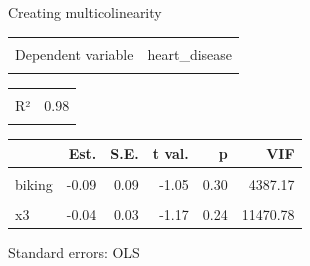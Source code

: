 \documentclass[
  ignorenonframetext,
]{beamer}
\begin{document}
\begin{frame}{Creating multicolinearity}
\protect\hypertarget{creating-multicolinearity-1}{}
\begin{table}[!h]
\centering
\begin{tabular}{lr}
\toprule
\cellcolor{gray!6}{Observations} & \cellcolor{gray!6}{498}\\
Dependent variable & heart\_disease\\
\cellcolor{gray!6}{Type} & \cellcolor{gray!6}{OLS linear regression}\\
\bottomrule
\end{tabular}
\end{table} \begin{table}[!h]
\centering
\begin{tabular}{lr}
\toprule
\cellcolor{gray!6}{F(3,494)} & \cellcolor{gray!6}{7936.46}\\
R² & 0.98\\
\cellcolor{gray!6}{Adj. R²} & \cellcolor{gray!6}{0.98}\\
\bottomrule
\end{tabular}
\end{table} \begin{table}[!h]
\centering
\begin{threeparttable}
\begin{tabular}{lrrrrr}
\toprule
  & Est. & S.E. & t val. & p & VIF\\
\midrule
\cellcolor{gray!6}{(Intercept)} & \cellcolor{gray!6}{15.02} & \cellcolor{gray!6}{0.08} & \cellcolor{gray!6}{177.09} & \cellcolor{gray!6}{0.00} & \cellcolor{gray!6}{NA}\\
biking & -0.09 & 0.09 & -1.05 & 0.30 & 4387.17\\
\cellcolor{gray!6}{smoking} & \cellcolor{gray!6}{-0.17} & \cellcolor{gray!6}{0.30} & \cellcolor{gray!6}{-0.58} & \cellcolor{gray!6}{0.56} & \cellcolor{gray!6}{7255.38}\\
x3 & -0.04 & 0.03 & -1.17 & 0.24 & 11470.78\\
\bottomrule
\end{tabular}
\begin{tablenotes}
\item Standard errors: OLS
\end{tablenotes}
\end{threeparttable}
\end{table}
\end{frame}
\end{document}
